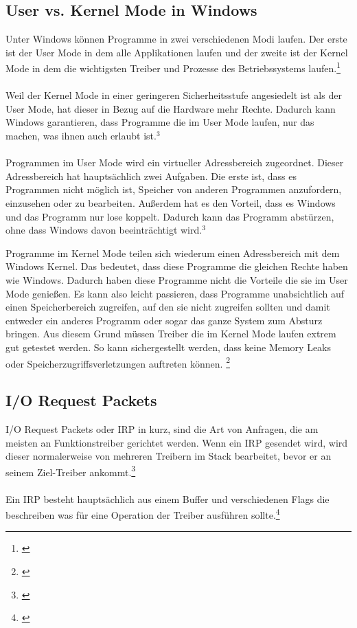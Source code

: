 \subsection{User vs. Kernel Mode in Windows}
Unter Windows können Programme in zwei verschiedenen Modi laufen. Der erste ist der User Mode in dem alle Applikationen laufen und der zweite ist der Kernel Mode in dem die wichtigsten Treiber und Prozesse des Betriebssystems laufen.\footnote[3]{\cite[Vgl.][]{21}}
\\\\
Weil der Kernel Mode in einer geringeren Sicherheitsstufe angesiedelt ist als der User Mode, hat dieser in Bezug auf die Hardware mehr Rechte. Dadurch kann Windows garantieren, dass Programme die im User Mode laufen, nur das machen, was ihnen auch erlaubt ist.$^{3}$
\\\\
Programmen im User Mode wird ein virtueller Adressbereich zugeordnet. Dieser Adressbereich hat hauptsächlich zwei Aufgaben. Die erste ist, dass es Programmen nicht möglich ist, Speicher von anderen Programmen anzufordern, einzusehen oder zu bearbeiten. Außerdem hat es den Vorteil, dass es Windows und das Programm nur lose koppelt. Dadurch kann das Programm abstürzen, ohne dass Windows davon beeinträchtigt wird.$^{3}$

\newpage
\noindent
Programme im Kernel Mode teilen sich wiederum einen Adressbereich mit dem Windows Kernel. Das bedeutet, dass diese Programme die gleichen Rechte haben wie Windows. Dadurch haben diese Programme nicht die Vorteile die sie im User Mode genießen. Es kann also leicht passieren, dass Programme unabsichtlich auf einen Speicherbereich zugreifen, auf den sie nicht zugreifen sollten und damit entweder ein anderes Programm oder sogar das ganze System zum Absturz bringen. Aus diesem Grund müssen Treiber die im Kernel Mode laufen extrem gut getestet werden. So kann sichergestellt werden, dass keine Memory Leaks oder Speicherzugriffsverletzungen auftreten können. \footnote[1]{\cite[Vgl.][]{21}}

\subsection{I/O Request Packets}
I/O Request Packets oder IRP in kurz, sind die Art von Anfragen, die am meisten an Funktionstreiber gerichtet werden. Wenn ein IRP gesendet wird, wird dieser normalerweise von mehreren Treibern im Stack bearbeitet, bevor er an seinem Ziel-Treiber ankommt.\footnote[2]{\cite[Vgl.][]{23}}
\\\\
Ein IRP besteht hauptsächlich aus einem Buffer und verschiedenen Flags die beschreiben was für eine Operation der Treiber ausführen sollte.\footnote[3]{\cite[Vgl.][]{22}}

